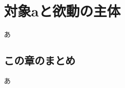 \section{対象aと欲動の主体}\label{ux7b2cux4e94ux7ae0ux5bfeux8c61aux3068ux6b32ux52d5ux306eux4e3bux4f53}

あ

\subsection{この章のまとめ}\label{ux3053ux306eux7ae0ux306eux307eux3068ux3081}

あ

